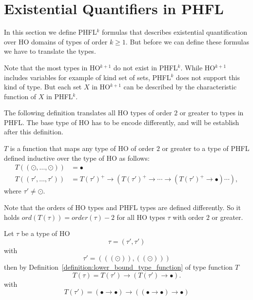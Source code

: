 

\section{Existential Quantifiers in PHFL}\label{sec:existential_quantifiers_in_phfl}

In this section we define PHFL$^{k}$ formulas that describes existential quantification over HO domains of types of
order $k \geq 1$. But before we can define these formulas we have to translate the types.


Note that the most types in HO$^{k + 1}$ do not exist in PHFL$^k$. While HO$^{k +
1}$ includes variables for example of kind set of sets, PHFL$^k$ does not support this kind of type.
But each set $X$ in HO$^{k+1}$ can be described by the characteristic function of $X$ in PHFL$^k$.

The following definition translates all HO types of order $2$ or greater to types in PHFL. The base type of HO
has to be encode differently, and will be establish after this definition.

\begin{definition}
    \label{definition:lower_bound_type_function}
    $T$ is a function that maps any type of HO of order $2$ or greater to a type of PHFL defined inductive over the
    type of HO as follows:
    \begin{align*}
        T((\odot, \dots, \odot)) &= \bullet\\
        T((\tau', \dots, \tau')) &= T(\tau')^+ \rightarrow (T(\tau')^+ \rightarrow \dotsb \rightarrow (T(\tau')^+
        \rightarrow \bullet) \dotsb ),
    \end{align*}
    where $\tau' \neq \odot$.
\end{definition}

Note that the orders of HO types and PHFL types are defined differently. So it holds $ord(T(\tau)) = order(\tau) - 2$
for all HO types $\tau$ with order $2$ or greater.

\begin{example}
    Let $\tau$ be a type of HO
    \[\tau = (\tau', \tau')\]
    with
    \[\tau' = (((\odot)), ((\odot)))\]
    then by Definition~\ref{definition:lower_bound_type_function} of type function $T$
    \[T(\tau) = T(\tau') \rightarrow (T(\tau') \rightarrow \bullet).\]
    with
    \[T(\tau') = (\bullet \rightarrow \bullet) \rightarrow ((\bullet \rightarrow \bullet) \rightarrow \bullet)\]
\end{example}


